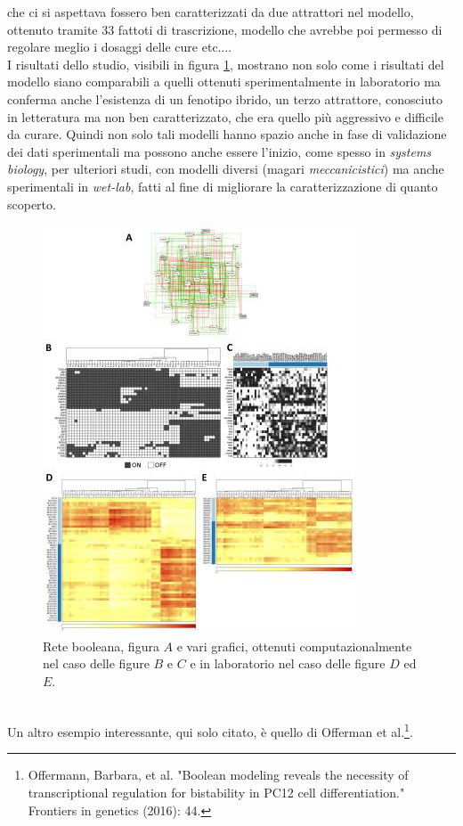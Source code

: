 \documentclass[a4paper,12pt, oneside]{book}
\begin{document}
che ci si aspettava fossero ben caratterizzati da due attrattori nel modello,
ottenuto tramite 33 fattoti di trascrizione, modello che avrebbe poi permesso di
regolare meglio i dosaggi delle cure etc$\ldots$.\\
I risultati dello studio, visibili
in figura \ref{fig:exbool5}, mostrano non solo come i risultati del modello
siano comparabili a quelli ottenuti sperimentalmente in laboratorio ma conferma
anche l'esistenza di un fenotipo ibrido, un terzo attrattore, conosciuto in
letteratura ma non ben 
caratterizzato, che era quello più aggressivo e difficile da curare. Quindi non
solo tali modelli hanno spazio anche in fase di validazione dei dati
sperimentali ma possono anche essere l'inizio, come spesso in \textit{systems
  biology}, per ulteriori studi, con modelli diversi (magari
\textit{meccanicistici}) ma anche sperimentali in \textit{wet-lab}, fatti al
fine di migliorare la caratterizzazione di quanto scoperto. 
\begin{figure}
  \centering
  \includegraphics[scale = 0.70]{img/exbool5.jpg}
  \caption{Rete booleana, figura $A$ e vari grafici, ottenuti computazionalmente
    nel caso delle figure $B$ e $C$ e in laboratorio nel caso delle figure
    $D$ ed $E$.}   
  \label{fig:exbool5}
\end{figure}
\\
Un altro esempio interessante, qui solo citato, è quello di Offerman et
al.\footnote{Offermann, Barbara, et al. "Boolean modeling reveals the necessity
  of transcriptional regulation for bistability in PC12 cell differentiation."
  Frontiers in genetics (2016): 44. }. 
\end{document}
